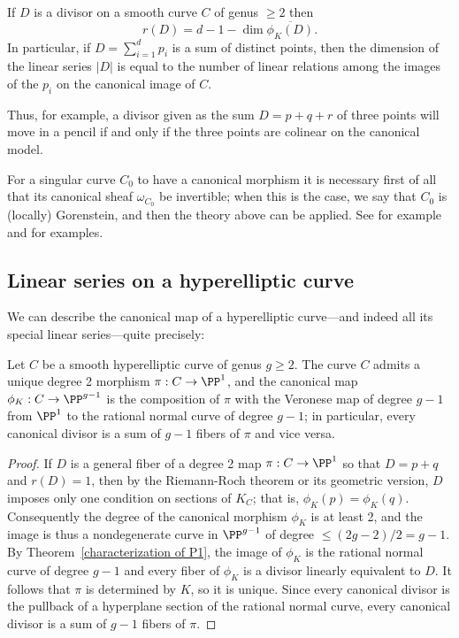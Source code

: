 \begin{corollary}\label{geometric RR}
If $D$ is a divisor on a smooth curve $C$ of genus $\geq 2$ then
$$
r(D) = d - 1 - \dim \overline{ \phi_K(D)}.
$$
In particular, if $D = \sum_{i=1}^dp_i$ is a sum of distinct points, then
 the dimension of the linear series $|D|$  is equal to the number of linear relations among the images of the $p_i$ on the canonical 
 image of $C$.
\end{corollary}

Thus, for example, a divisor given as the sum $D = p+q+r$ of three points will move in a pencil if and only if the three points are colinear on the canonical model.

\begin{remark}
For a singular curve $C_0$ to have a canonical morphism it is necessary first of all that its canonical sheaf
 $\omega_{C_0}$ be invertible; when this is the case, we say that $C_0$ is (locally) Gorenstein, and then
the theory above can be applied. See for example \cite{graphcurves} and \cite{ribbons} for examples. 
\end{remark}

\subsection{Linear series on a hyperelliptic curve}
We can describe the canonical map of a hyperelliptic curve---and indeed all its special linear series---quite precisely:

\begin{corollary}\label{canonical on hyperelliptic}
Let $C$ be a smooth hyperelliptic curve of genus $g\geq 2$. The curve $C$ admits a unique degree 2 morphism $\pi: C\to \PP^1$,
and the canonical map $\phi_K: C\to \PP^{g-1}$ is the composition of $\pi$ with the Veronese map of degree $g-1$ from
$\PP^1$ to the rational normal curve of degree $g-1$; in particular, every canonical divisor is a sum of $g-1$ fibers of $\pi$ and vice versa.
\end{corollary}

\begin{proof}
If $D$ is a general fiber of a degree 2 map $\pi:C\to \PP^1$ so that $D= p+q$ and $r(D) = 1$, then by the Riemann-Roch theorem or its geometric version, $D$ imposes only one condition on sections of $K_C$; that is, $\phi_K(p) = \phi_K(q)$. Consequently the degree of the canonical morphism $\phi_K$ is at least 2, and the image is thus a nondegenerate curve in $\PP^{g-1}$ of degree $\leq (2g-2)/2 = g-1$. By Theorem~\ref{characterization of P1}, the image of $\phi_K$ is the rational normal curve of degree $g-1$ and every fiber of $\phi_K$ is a divisor linearly equivalent to $D$. It follows that $\pi$ is determined by $K$, so it is unique. Since every canonical divisor is the pullback of a hyperplane section of the rational normal curve,
every canonical divisor is a sum of $g-1$ fibers of $\pi$.
\end{proof}


